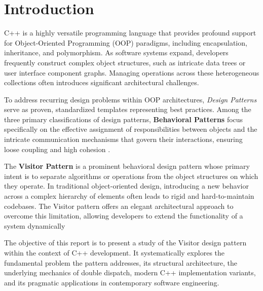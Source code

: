 \section{Introduction}
\label{sec:introduction}

C++ is a highly versatile programming language that provides profound support for Object-Oriented Programming (OOP) paradigms, including encapsulation, inheritance, and polymorphism. As software systems expand, developers frequently construct complex object structures, such as intricate data trees or user interface component graphs. Managing operations across these heterogeneous collections often introduces significant architectural challenges.

To address recurring design problems within OOP architectures, \textit{Design Patterns} serve as proven, standardized templates representing best practices. Among the three primary classifications of design patterns, \textbf{Behavioral Patterns} focus specifically on the effective assignment of responsibilities between objects and the intricate communication mechanisms that govern their interactions, ensuring loose coupling and high cohesion \cite{gof1994}.

The \textbf{Visitor Pattern} is a prominent behavioral design pattern whose primary intent is to separate algorithms or operations from the object structures on which they operate. In traditional object-oriented design, introducing a new behavior across a complex hierarchy of elements often leads to rigid and hard-to-maintain codebases. The Visitor pattern offers an elegant architectural approach to overcome this limitation, allowing developers to extend the functionality of a system dynamically \cite{gof1994}

The objective of this report is to present a study of the Visitor design pattern within the context of C++ development. It systematically explores the fundamental problem the pattern addresses, its structural architecture, the underlying mechanics of double dispatch, modern C++ implementation variants, and its pragmatic applications in contemporary software engineering.
